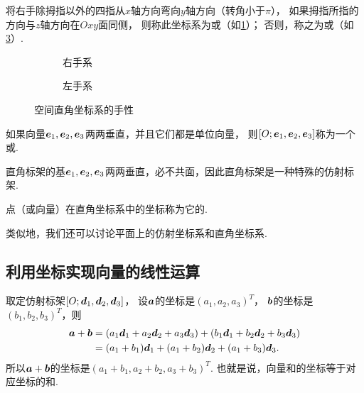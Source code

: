 将右手除拇指以外的四指从\(x\)轴方向弯向\(y\)轴方向（转角小于\(\pi\)），
如果拇指所指的方向与\(z\)轴方向在\(Oxy\)面同侧，
则称此坐标系为或（如\cref{figure:解析几何.右手系}）；
否则，称之为或（如\cref{figure:解析几何.左手系}）.

\begin{figure}[ht]
	\centering
	\def\subwidth{.4\linewidth}
	\begin{subfigure}[b]{\subwidth}
		\centering
		\caption{右手系}
		\label{figure:解析几何.右手系}
	\end{subfigure}
	\begin{subfigure}[b]{\subwidth}
		\centering
		\caption{左手系}
		\label{figure:解析几何.左手系}
	\end{subfigure}
	\caption{空间直角坐标系的手性}
\end{figure}

\begin{definition}
如果向量\(\boldsymbol{e}_1,\boldsymbol{e}_2,\boldsymbol{e}_3\)两两垂直，并且它们都是单位向量，
则\([O;\boldsymbol{e}_1,\boldsymbol{e}_2,\boldsymbol{e}_3]\)称为一个或.
\end{definition}

直角标架的基\(\boldsymbol{e}_1,\boldsymbol{e}_2,\boldsymbol{e}_3\)两两垂直，必不共面，因此直角标架是一种特殊的仿射标架.

点（或向量）在直角坐标系中的坐标称为它的.

类似地，我们还可以讨论平面上的仿射坐标系和直角坐标系.

\subsection{利用坐标实现向量的线性运算}
取定仿射标架\([O;\boldsymbol{d}_1,\boldsymbol{d}_2,\boldsymbol{d}_3]\)，
设\(\boldsymbol{a}\)的坐标是\((a_1,a_2,a_3)^T\)，
\(\boldsymbol{b}\)的坐标是\((b_1,b_2,b_3)^T\)，则\begin{align*}
\boldsymbol{a}+\boldsymbol{b}
&= (a_1 \boldsymbol{d}_1 + a_2 \boldsymbol{d}_2 + a_3 \boldsymbol{d}_3)
+ (b_1 \boldsymbol{d}_1 + b_2 \boldsymbol{d}_2 + b_3 \boldsymbol{d}_3) \\
&= (a_1 + b_1) \boldsymbol{d}_1 + (a_1 + b_2) \boldsymbol{d}_2 + (a_1 + b_3) \boldsymbol{d}_3.
\end{align*}
所以\(\boldsymbol{a}+\boldsymbol{b}\)的坐标是\((a_1+b_1,a_2+b_2,a_3+b_3)^T\).
也就是说，向量和的坐标等于对应坐标的和.

